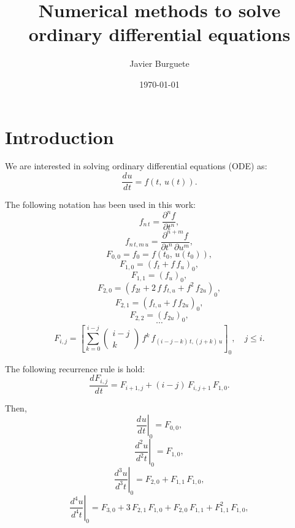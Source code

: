 \documentclass[a4paper]{article}
\title{Numerical methods to solve ordinary differential equations}
\author{Javier Burguete}
\date{\today}
\newcommand{\C}[1]{\left[#1\right]}
\newcommand{\COMB}[2]{\left(\begin{array}{c}#1\\#2\end{array}\right)}
\newcommand{\D}[3]{\frac{d^{#3}#1}{d^{#3}#2}}
\newcommand{\EQ}[2]{\begin{equation}#1\label{#2}\end{equation}}
\newcommand{\PA}[1]{\left(#1\right)}
\newcommand{\PARTIAL}[2]{\frac{\partial #1}{\partial #2}}
\begin{document}
\maketitle

\tableofcontents

\section{Introduction}

We are interested in solving ordinary differential equations (ODE) as:
\EQ{\D{u}{t}{}=f\PA{t,\,u(t)}.}{EqODE}

The following notation has been used in this work:
\[f_{n\,t}=\PARTIAL{^nf}{t^n},\]
\[f_{n\,t,m\,u}=\PARTIAL{^{n+m}f}{t^n\,\partial u^m},\]
\[F_{0,0}=f_0=f\PA{t_0,\,u\PA{t_0}},\]
\[F_{1,0}=\PA{f_t+f\,f_u}_0,\]
\[F_{1,1}=\PA{f_u}_0,\]
\[F_{2,0}=\PA{f_{2t}+2\,f\,f_{t,u}+f^2\,f_{2u}}_0,\]
\[F_{2,1}=\PA{f_{t,u}+f\,f_{2u}}_0,\]
\[F_{2,2}=\PA{f_{2u}}_0,\]
\[\cdots\]
\[
	F_{i,j}=\C{\sum_{k=0}^{i-j}\COMB{i-j}{k}\,f^k\,f_{(i-j-k)\,t,(j+k)\,u}}_0,
	\quad j\leq i.
\]

The following recurrence rule is hold:
\EQ{\D{F_{i,j}}{t}{}=F_{i+1,j}+(i-j)\,F_{i,j+1}\,F_{1,0}.}{EqdF}

Then,
\[\left.\D{u}{t}{}\right|_0=F_{0,0},\]
\[\left.\D{u}{t}{2}\right|_0=F_{1,0},\]
\[\left.\D{u}{t}{3}\right|_0=F_{2,0}+F_{1,1}\,F_{1,0},\]
\[
	\left.\D{u}{t}{4}\right|_0=F_{3,0}+3\,F_{2,1}\,F_{1,0}+F_{2,0}\,F_{1,1}
	+F_{1,1}^2\,F_{1,0},
\]
\end{document}

